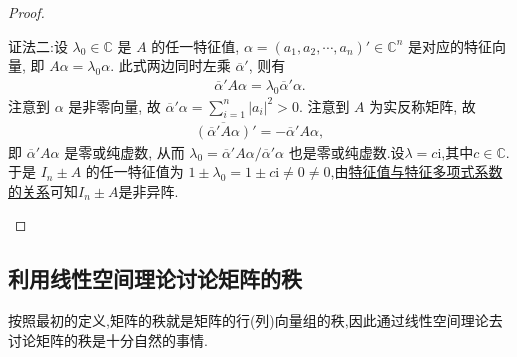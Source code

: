 \documentclass[../../main.tex]{subfiles}%
\begin{document}
\begin{proof}
\begin{enumerate}[(1)]
{\color{blue}证法二:}设 $\lambda_0 \in \mathbb{C}$ 是 $A$ 的任一特征值, $\alpha = (a_1, a_2, \cdots, a_n)' \in \mathbb{C}^n$ 是对应的特征向量, 即 $A\alpha = \lambda_0 \alpha$. 此式两边同时左乘 $\overline{\alpha }' $, 则有
\begin{align*}
\overline{\alpha }'  A \alpha = \lambda_0 \overline{\alpha }'  \alpha.
\end{align*}
注意到 $\alpha$ 是非零向量, 故 $\overline{\alpha }' \alpha = \sum_{i=1}^n |a_i|^2 > 0$. 注意到 $A$ 为实反称矩阵, 故
\begin{align*}
\overline{(\overline{\alpha }'  A\alpha )}' = -\overline{\alpha }' A \alpha,
\end{align*}
即 $\overline{\alpha }'  A \alpha$ 是零或纯虚数, 从而 $\lambda_0 = \overline{\alpha }'  A \alpha / \overline{\alpha }'  \alpha$ 也是零或纯虚数.设$\lambda=c\mathrm{i}$,其中$c\in \mathbb{C}$.
于是 $I_n \pm A$ 的任一特征值为 $1 \pm \lambda_0 = 1 \pm c\mathrm{i} \neq 0\ne 0$,由\hyperref[proposition:特征值与特征多项式系数的关系]{特征值与特征多项式系数的关系}可知$I_n\pm A$是非异阵.
\end{enumerate}

\end{proof}



\subsection{利用线性空间理论讨论矩阵的秩}
按照最初的定义,矩阵的秩就是矩阵的行(列)向量组的秩,因此通过线性空间理论去讨论矩阵的秩是十分自然的事情.
\end{document}
